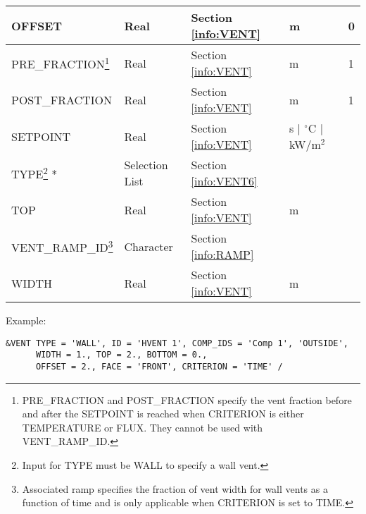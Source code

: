 \begin{minipage}{6.5in}
\begin{longtable}{@{\extracolsep{\fill}}|l|l|l|l|l|}
{\ct OFFSET}       					 & Real 		  & Section \ref{info:VENT}      & m                           &      0        \\ \hline
{\ct PRE\_FRACTION}\footnote{{\ct PRE\_FRACTION} and {\ct POST\_FRACTION} specify the vent fraction before and after the {\ct SETPOINT} is reached when {\ct CRITERION} is either {\ct TEMPERATURE} or {\ct FLUX}. They cannot be used with {\ct VENT\_RAMP\_ID}.}       					 & Real 		  & Section \ref{info:VENT}      & m                           &      1        \\ \hline
{\ct POST\_FRACTION}       					 & Real 		  & Section \ref{info:VENT}      & m                           &      1        \\ \hline
{\ct SETPOINT}           					 & Real  	          & Section \ref{info:VENT}      & s $\mid$ $^\circ$C $\mid$ kW/m$^2$ &                 \\ \hline
{\ct TYPE}\footnote{Input for {\ct TYPE} must be {\ct WALL} to specify a wall vent. } *
                                                                 & Selection List         & Section \ref{info:VENT6}     &                             &                 \\ \hline
{\ct TOP}                 & Real                   & Section \ref{info:VENT}      & m                        &                 \\ \hline
{\ct VENT\_RAMP\_ID}\footnote{Associated ramp specifies the fraction of vent width for wall vents as a function of time and is only applicable when {\ct CRITERION} is set to {\ct TIME}.}  					 & Character  		  & Section \ref{info:RAMP}      &                             &                 \\ \hline
{\ct WIDTH}                                                      & Real                   & Section \ref{info:VENT}      & m                           &                 \\ \hline
\end{longtable}
\end{minipage}


\noindent Example:
\begin{lstlisting}
&VENT TYPE = 'WALL', ID = 'HVENT 1', COMP_IDS = 'Comp 1', 'OUTSIDE',
      WIDTH = 1., TOP = 2., BOTTOM = 0.,
      OFFSET = 2., FACE = 'FRONT', CRITERION = 'TIME' /

\end{lstlisting}

